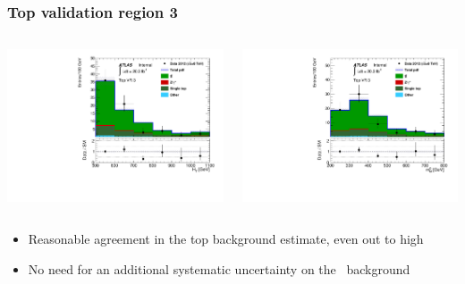 \documentclass[10pt, svgnames]{beamer}
\begin{document}
\begin{frame}
  \frametitle{Top validation region 3}
  \begin{columns}
    \begin{block}{\HT}
      \includegraphics[width=\textwidth]{figures/vr_top_3_ht_signal.pdf}
    \end{block}
    \begin{block}{\MBL}
      \includegraphics[width=\textwidth]{figures/vr_top_3_mbl_0.pdf}
    \end{block}
  \end{columns}
  \begin{itemize}
    \item Reasonable agreement in the top background estimate, even out to
      high \HT
    \item No need for an additional systematic uncertainty on the
      \TTBAR\ background
  \end{itemize}
\end{frame}
\end{document}
